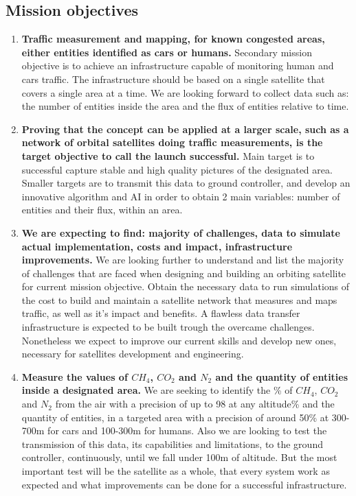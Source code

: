\documentclass[11pt]{article}
\begin{document}
\subsection{Mission objectives}
\begin{enumerate}
    \item\textbf{Traffic measurement and mapping, for known congested areas, either entities identified as cars or humans.} {Secondary mission objective is to achieve an infrastructure capable of monitoring human and cars traffic. The infrastructure should be based on a single satellite that covers a single area at a time. We are looking forward to collect data such as: the number of entities inside the area and the flux of entities relative to time.}
    \item\textbf{Proving that the concept can be applied at a larger scale, such as a network of orbital satellites doing traffic measurements, is the target objective to call the launch successful.} {Main target is to successful capture stable and high quality pictures of the designated area. Smaller targets are to transmit this data to ground controller, and develop an innovative algorithm and AI in order to obtain 2 main variables: number of entities and their flux, within an area.}
    \item\textbf{We are expecting to find: majority of challenges, data to simulate actual implementation, costs and impact, infrastructure improvements.} {We are looking further to understand and list the majority of challenges that are faced when designing and building an orbiting satellite for current mission objective. Obtain the necessary data to run simulations of the cost to build and maintain a satellite network that measures and maps traffic, as well as it's impact and benefits. A flawless data transfer infrastructure is expected to be built trough the overcame challenges. Nonetheless we expect to improve our current skills and develop new ones, necessary for satellites development and engineering.}
    \item\textbf{Measure the values of $CH_4$, $CO_2$ and $N_2$ and the quantity of entities inside a designated area.} {We are seeking to identify the \% of $CH_4$, $CO_2$ and $N_2$ from the air with a precision of up to 98 at any altitude\% and the quantity of entities, in a targeted area with a precision of around 50\% at 300-700m for cars and 100-300m for humans. Also we are looking to test the transmission of this data, its capabilities and limitations, to the ground controller, continuously, until we fall under 100m of altitude. But the most important test will be the satellite as a whole, that every system work as expected and what improvements can be done for a successful infrastructure.}
\end{enumerate}
\end{document}
